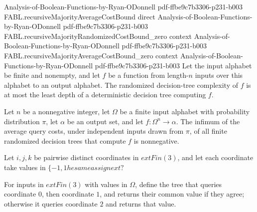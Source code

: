 \begin{theorem}
  {Analysis-of-Boolean-Functions-by-Ryan-ODonnell}
  {pdf-ffbe9c7b3306-p231-b003}
\proofstep
  {FABL.recursiveMajorityAverageCostBound}
  {direct}
  {Analysis-of-Boolean-Functions-by-Ryan-ODonnell}
  {pdf-ffbe9c7b3306-p231-b003}
\proofstep
  {FABL.recursiveMajorityRandomizedCostBound_zero}
  {context}
  {Analysis-of-Boolean-Functions-by-Ryan-ODonnell}
  {pdf-ffbe9c7b3306-p231-b003}
\proofstep
  {FABL.recursiveMajorityAverageCostBound_zero}
  {context}
  {Analysis-of-Boolean-Functions-by-Ryan-ODonnell}
  {pdf-ffbe9c7b3306-p231-b003}
Let the input alphabet be finite and nonempty, and let $f$ be a function from length-$n$
inputs over this alphabet to an output alphabet. The randomized decision-tree complexity
of $f$ is at most the least depth of a deterministic decision tree computing $f$.
\end{theorem}

\begin{theorem}
\label{FABL.RandomizedDecisionTree.averageComplexity_nonneg}
\leanok
{}
Let $n$ be a nonnegative integer, let $\Omega$ be a finite input alphabet with
probability distribution $\pi$, let $\alpha$ be an output set, and let
$f:\Omega^n\to\alpha$. The infimum of the average query costs, under independent
inputs drawn from $\pi$, of all finite randomized decision trees that compute $f$ is
nonnegative.
\end{theorem}

\begin{definition}
\label{FABL.majorityThreePairTree}
\leanok
{}
Let $i,j,k$ be pairwise distinct coordinates in $	ext{Fin}(3)$, and let each coordinate
take values in $\{-1,1	he same as sign	ext{?}$
\end{definition}

\begin{definition}
\label{FABL.majorityThreeTree01}
\leanok
{}
For inputs in $	ext{Fin}(3)$ with values in $\Omega$, define the tree that queries coordinate
$0$, then coordinate $1$, and returns their common value if they agree; otherwise it
queries coordinate $2$ and returns that value.
\end{definition}

